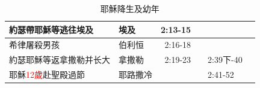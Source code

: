 \begin{table}[H]
\begin{tabular}{p{8.93em}c|p{5.07em}|r|c|p{5.215em}|c}
\multicolumn{2}{p{14.575em}|}{約瑟帶耶穌等逃往埃及} & 埃及    & \multicolumn{1}{p{4.215em}|}{2:13-15} &       & \multicolumn{1}{r|}{} &  \\
    \midrule
    \multicolumn{2}{p{14.575em}|}{希律屠殺男孩} & 伯利恒   & \multicolumn{1}{p{4.215em}|}{2:16-18} &       & \multicolumn{1}{r|}{} &  \\
    \midrule
    \multicolumn{2}{p{14.575em}|}{約瑟耶穌等返拿撒勒并长大} & 拿撒勒   & \multicolumn{1}{p{4.215em}|}{2:19-23} &       & 2:39下-40 &  \\
    \midrule
    \multicolumn{2}{p{14.575em}|}{耶穌\textcolor{red}{12歲}赴聖殿過節} & 耶路撒冷  &       &       & 2:41-52&  \\
    \bottomrule
    \end{tabular}%
         \caption{耶穌降生及幼年}
  \label{tab:addlabel}%
\end{table}%


